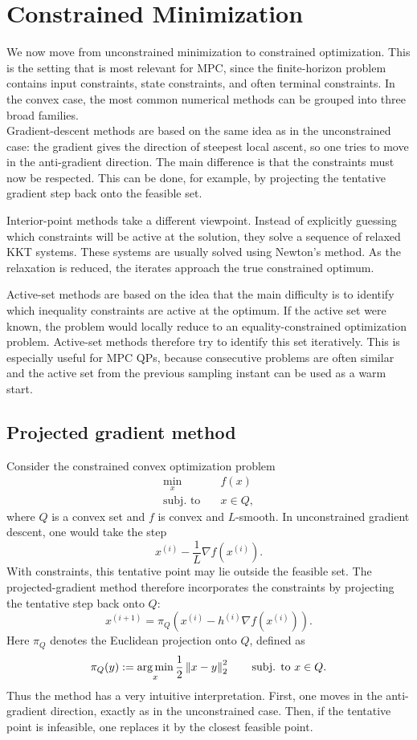 \section{Constrained Minimization}

We now move from unconstrained minimization to constrained optimization. This is the setting
that is most relevant for MPC, since the finite-horizon problem contains input constraints, state
constraints, and often terminal constraints. In the convex case, the most common numerical
methods can be grouped into three broad families.\\

Gradient-descent methods are based on the same idea as in the unconstrained case: the gradient
gives the direction of steepest local ascent, so one tries to move in the anti-gradient direction.
The main difference is that the constraints must now be respected. This can be done, for
example, by projecting the tentative gradient step back onto the feasible set.

Interior-point methods take a different viewpoint. Instead of explicitly guessing which
constraints will be active at the solution, they solve a sequence of relaxed KKT systems. These
systems are usually solved using Newton's method. As the relaxation is reduced, the iterates
approach the true constrained optimum.

Active-set methods are based on the idea that the main difficulty is to identify which inequality
constraints are active at the optimum. If the active set were known, the problem would locally
reduce to an equality-constrained optimization problem. Active-set methods therefore try to
identify this set iteratively. This is especially useful for MPC QPs, because consecutive problems
are often similar and the active set from the previous sampling instant can be used as a warm
start.

\subsection{Projected gradient method}

Consider the constrained convex optimization problem
\[
\begin{aligned}
    \min_x \quad & f(x)\\
    \text{subj. to}\quad & x\in Q,
\end{aligned}
\tag{P}
\]
where \(Q\) is a convex set and \(f\) is convex and \(L\)-smooth. In unconstrained gradient
descent, one would take the step
\[
    x^{(i)}-\frac{1}{L}\nabla f(x^{(i)}).
\]
With constraints, this tentative point may lie outside the feasible set. The projected-gradient
method therefore incorporates the constraints by projecting the tentative step back onto \(Q\):
\[
    x^{(i+1)}
    =
    \pi_Q
    \left(
        x^{(i)}-h^{(i)}\nabla f(x^{(i)})
    \right).
\]
Here \(\pi_Q\) denotes the Euclidean projection onto \(Q\), defined as
\[
    \pi_Q(y)
    :=
    \operatorname*{arg\,min}_x
    \frac{1}{2}\left\lVert x-y \right\rVert_2^2
    \qquad
    \text{subj. to } x\in Q.
\]
Thus the method has a very intuitive interpretation. First, one moves in the anti-gradient
direction, exactly as in the unconstrained case. Then, if the tentative point is infeasible, one
replaces it by the closest feasible point.

